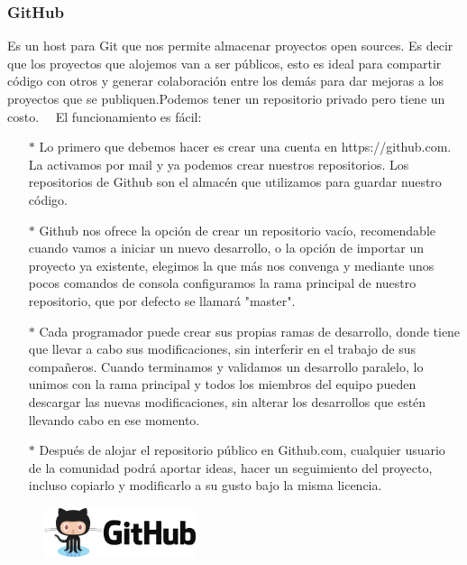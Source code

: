 \documentclass[12pt]{article}
\begin{document}
\subsubsection{GitHub}
Es un host para Git que nos permite almacenar proyectos open sources. Es decir que los proyectos que alojemos van a ser públicos, esto es ideal para compartir código con otros y generar colaboración entre los demás para dar mejoras a los proyectos que se publiquen.Podemos tener un repositorio privado pero tiene un costo.
\ \
El funcionamiento es fácil:
\begin{itemize}
	\item[$*$]Lo primero que debemos hacer es crear una cuenta en https://github.com. La activamos por mail y ya podemos crear nuestros repositorios. Los repositorios de Github son el almacén que utilizamos para guardar nuestro código. 
\item[$*$]Github nos ofrece la opción de crear un repositorio vacío, recomendable cuando vamos a iniciar un nuevo desarrollo, o la opción de importar un proyecto ya existente, elegimos la que más nos convenga y mediante unos pocos comandos de consola configuramos la rama principal de nuestro repositorio, que por defecto se llamará "master". 
\item[$*$]Cada programador puede crear sus propias ramas de desarrollo, donde tiene que llevar a cabo sus modificaciones, sin interferir en el trabajo de sus compañeros. Cuando terminamos y validamos un desarrollo paralelo, lo unimos con la rama principal y todos los miembros del equipo pueden descargar las nuevas modificaciones, sin alterar los desarrollos que estén llevando cabo en ese momento. 
\item[$*$] Después de alojar el repositorio público en Github.com, cualquier usuario de la comunidad podrá aportar ideas, hacer un seguimiento del proyecto, incluso copiarlo y modificarlo a su gusto bajo la misma licencia.
\end{itemize}

\begin{figure}
\begin{center}
  \includegraphics[width=0.4\textwidth]{imagenes/github.png}
\end{center}
\end{figure}

\newpage
\end{document}
